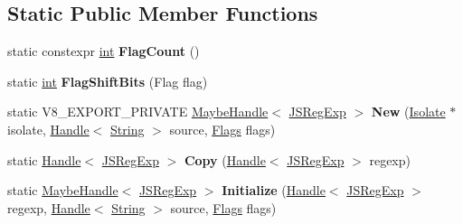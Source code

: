 \subsection*{Static Public Member Functions}
\begin{DoxyCompactItemize}
\item 
\mbox{\label{classv8_1_1internal_1_1JSRegExp_a313c8853b1eeb17920ae524c5c2e3b6d}} 
static constexpr \mbox{\hyperlink{classint}{int}} {\bfseries Flag\+Count} ()
\item 
\mbox{\label{classv8_1_1internal_1_1JSRegExp_a4bd607ee831548a9cd8644dac4610907}} 
static \mbox{\hyperlink{classint}{int}} {\bfseries Flag\+Shift\+Bits} (Flag flag)
\item 
\mbox{\label{classv8_1_1internal_1_1JSRegExp_a09ce92a1b72079d078d92d0bd8e6f565}} 
static V8\+\_\+\+E\+X\+P\+O\+R\+T\+\_\+\+P\+R\+I\+V\+A\+TE \mbox{\hyperlink{classv8_1_1internal_1_1MaybeHandle}{Maybe\+Handle}}$<$ \mbox{\hyperlink{classv8_1_1internal_1_1JSRegExp}{J\+S\+Reg\+Exp}} $>$ {\bfseries New} (\mbox{\hyperlink{classv8_1_1internal_1_1Isolate}{Isolate}} $\ast$isolate, \mbox{\hyperlink{classv8_1_1internal_1_1Handle}{Handle}}$<$ \mbox{\hyperlink{classv8_1_1internal_1_1String}{String}} $>$ source, \mbox{\hyperlink{classv8_1_1base_1_1Flags}{Flags}} flags)
\item 
\mbox{\label{classv8_1_1internal_1_1JSRegExp_a2b99bd96f29204a62eacba90a635af23}} 
static \mbox{\hyperlink{classv8_1_1internal_1_1Handle}{Handle}}$<$ \mbox{\hyperlink{classv8_1_1internal_1_1JSRegExp}{J\+S\+Reg\+Exp}} $>$ {\bfseries Copy} (\mbox{\hyperlink{classv8_1_1internal_1_1Handle}{Handle}}$<$ \mbox{\hyperlink{classv8_1_1internal_1_1JSRegExp}{J\+S\+Reg\+Exp}} $>$ regexp)
\item 
\mbox{\label{classv8_1_1internal_1_1JSRegExp_a507f1b933f6d7b57d9ee19251588a47b}} 
static \mbox{\hyperlink{classv8_1_1internal_1_1MaybeHandle}{Maybe\+Handle}}$<$ \mbox{\hyperlink{classv8_1_1internal_1_1JSRegExp}{J\+S\+Reg\+Exp}} $>$ {\bfseries Initialize} (\mbox{\hyperlink{classv8_1_1internal_1_1Handle}{Handle}}$<$ \mbox{\hyperlink{classv8_1_1internal_1_1JSRegExp}{J\+S\+Reg\+Exp}} $>$ regexp, \mbox{\hyperlink{classv8_1_1internal_1_1Handle}{Handle}}$<$ \mbox{\hyperlink{classv8_1_1internal_1_1String}{String}} $>$ source, \mbox{\hyperlink{classv8_1_1base_1_1Flags}{Flags}} flags)

\end{DoxyCompactItemize}
